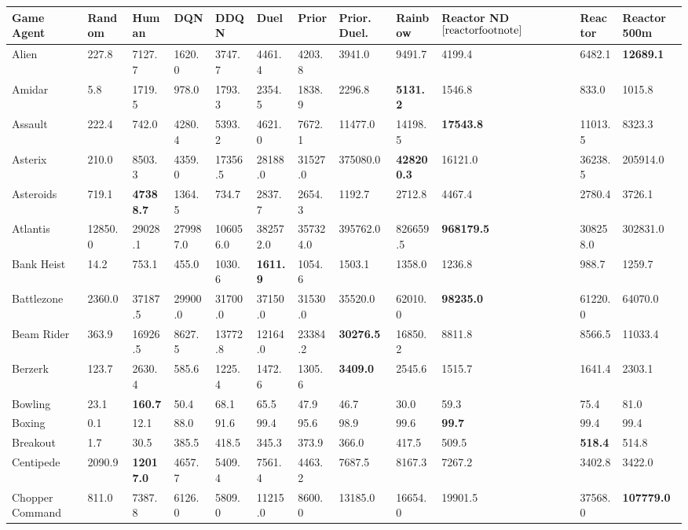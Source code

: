 \hspace{-40px}\begin{tabular}{| p{2.4cm} p{0.84cm} p{0.84cm} p{0.84cm} p{0.84cm} p{0.84cm} p{0.84cm} p{0.84cm} p{0.84cm} p{0.84cm} p{0.84cm} p{0.84cm} |}
\hline
Game \/ Agent  & Random & Human & DQN & DDQN & Duel & Prior & Prior. Duel. & Rainbow & Reactor ND $^{\ref{reactorfootnote}}$ & Reactor & Reactor 500m\\
\hline
Alien & 227.8 & 7127.7 & 1620.0 & 3747.7 & 4461.4 & 4203.8 & 3941.0 & 9491.7 & 4199.4 & 6482.1 & {\bf 12689.1}\\
Amidar & 5.8 & 1719.5 & 978.0 & 1793.3 & 2354.5 & 1838.9 & 2296.8 & {\bf 5131.2} & 1546.8 & 833.0 & 1015.8\\
Assault & 222.4 & 742.0 & 4280.4 & 5393.2 & 4621.0 & 7672.1 & 11477.0 & 14198.5 & {\bf 17543.8} & 11013.5 & 8323.3\\
Asterix & 210.0 & 8503.3 & 4359.0 & 17356.5 & 28188.0 & 31527.0 & 375080.0 & {\bf 428200.3} & 16121.0 & 36238.5 & 205914.0\\
Asteroids & 719.1 & {\bf 47388.7} & 1364.5 & 734.7 & 2837.7 & 2654.3 & 1192.7 & 2712.8 & 4467.4 & 2780.4 & 3726.1\\
Atlantis & 12850.0 & 29028.1 & 279987.0 & 106056.0 & 382572.0 & 357324.0 & 395762.0 & 826659.5 & {\bf 968179.5} & 308258.0 & 302831.0\\
Bank Heist & 14.2 & 753.1 & 455.0 & 1030.6 & {\bf 1611.9} & 1054.6 & 1503.1 & 1358.0 & 1236.8 & 988.7 & 1259.7\\
Battlezone & 2360.0 & 37187.5 & 29900.0 & 31700.0 & 37150.0 & 31530.0 & 35520.0 & 62010.0 & {\bf 98235.0} & 61220.0 & 64070.0\\
Beam Rider & 363.9 & 16926.5 & 8627.5 & 13772.8 & 12164.0 & 23384.2 & {\bf 30276.5} & 16850.2 & 8811.8 & 8566.5 & 11033.4\\
Berzerk & 123.7 & 2630.4 & 585.6 & 1225.4 & 1472.6 & 1305.6 & {\bf 3409.0} & 2545.6 & 1515.7 & 1641.4 & 2303.1\\
Bowling & 23.1 & {\bf 160.7} & 50.4 & 68.1 & 65.5 & 47.9 & 46.7 & 30.0 & 59.3 & 75.4 & 81.0\\
Boxing & 0.1 & 12.1 & 88.0 & 91.6 & 99.4 & 95.6 & 98.9 & 99.6 & {\bf 99.7} & 99.4 & 99.4\\
Breakout & 1.7 & 30.5 & 385.5 & 418.5 & 345.3 & 373.9 & 366.0 & 417.5 & 509.5 & {\bf 518.4} & 514.8\\
Centipede & 2090.9 & {\bf 12017.0} & 4657.7 & 5409.4 & 7561.4 & 4463.2 & 7687.5 & 8167.3 & 7267.2 & 3402.8 & 3422.0\\
Chopper Command & 811.0 & 7387.8 & 6126.0 & 5809.0 & 11215.0 & 8600.0 & 13185.0 & 16654.0 & 19901.5 & 37568.0 & {\bf 107779.0}\\

\end{tabular}
